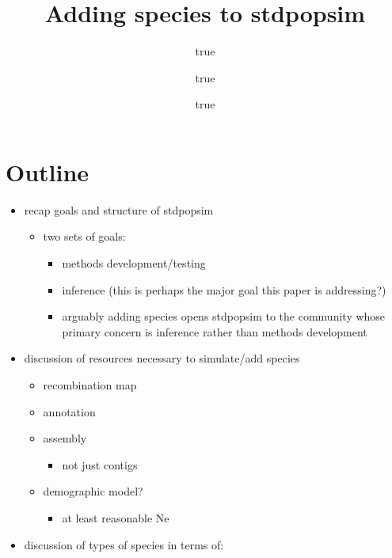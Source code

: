\documentclass[
  11pt,
]{article}
\title{Adding species to stdpopsim}
\author{true \and true \and true}
\date{}
\providecommand{\tightlist}{%
  \setlength{\itemsep}{0pt}\setlength{\parskip}{0pt}}
\begin{document}
\maketitle

\hypertarget{outline}{%
\section{Outline}\label{outline}}

\begin{itemize}
\tightlist
\item
  recap goals and structure of stdpopsim

  \begin{itemize}
  \tightlist
  \item
    two sets of goals:

    \begin{itemize}
    \tightlist
    \item
      methods development/testing
    \item
      inference (this is perhaps the major goal this paper is
      addressing?)
    \item
      arguably adding species opens stdpopsim to the community whose
      primary concern is inference rather than methods development
    \end{itemize}
  \end{itemize}
\item
  discussion of resources necessary to simulate/add species

  \begin{itemize}
  \tightlist
  \item
    recombination map
  \item
    annotation
  \item
    assembly

    \begin{itemize}
    \tightlist
    \item
      not just contigs
    \end{itemize}
  \item
    demographic model?

    \begin{itemize}
    \tightlist
    \item
      at least reasonable Ne
    \end{itemize}
  \end{itemize}
\item
  discussion of types of species in terms of:


\end{itemize}
\end{document}
